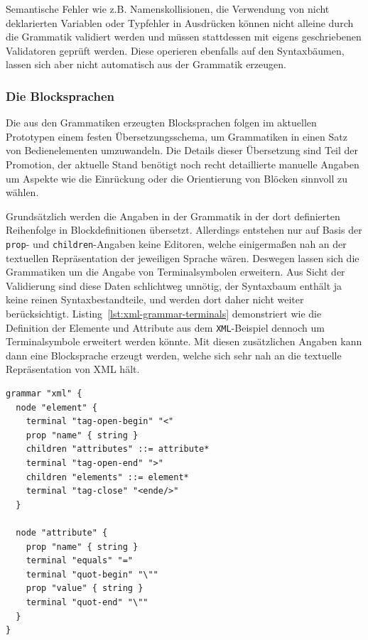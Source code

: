 \documentclass[paper=a4,fontsize=12pt,parskip=half]{scrartcl}
\begin{document}
Semantische Fehler wie z.B. Namenskollisionen, die Verwendung von nicht deklarierten Variablen oder Typfehler in Ausdrücken können nicht alleine durch die Grammatik validiert werden und müssen stattdessen mit eigens geschriebenen Validatoren geprüft werden. Diese operieren ebenfalls auf den Syntaxbäumen, lassen sich aber nicht automatisch aus der Grammatik erzeugen.

\subsubsection{Die Blocksprachen}

Die aus den Grammatiken erzeugten Blocksprachen folgen im aktuellen Prototypen einem festen Übersetzungsschema, um Grammatiken in einen Satz von Bedienelementen umzuwandeln. Die Details dieser Übersetzung sind Teil der Promotion, der aktuelle Stand benötigt noch recht detaillierte manuelle Angaben um Aspekte wie die Einrückung oder die Orientierung von Blöcken sinnvoll zu wählen.

Grundsätzlich werden die Angaben in der Grammatik in der dort definierten Reihenfolge in Blockdefinitionen übersetzt. Allerdings entstehen nur auf Basis der \texttt{prop}- und \texttt{children}-Angaben keine Editoren, welche einigermaßen nah an der textuellen Repräsentation der jeweiligen Sprache wären. Deswegen lassen sich die Grammatiken um die Angabe von Terminalsymbolen erweitern. Aus Sicht der Validierung sind diese Daten schlichtweg unnötig, der Syntaxbaum enthält ja keine reinen Syntaxbestandteile, und werden dort daher nicht weiter berücksichtigt. Listing~\ref{lst:xml-grammar-terminals} demonstriert wie die Definition der Elemente und Attribute aus dem \texttt{XML}-Beispiel dennoch um Terminalsymbole erweitert werden könnte. Mit diesen zusätzlichen Angaben kann dann eine Blocksprache erzeugt werden, welche sich sehr nah an die textuelle Repräsentation von XML hält.

\begin{lstlisting}[float=h, label={lst:xml-grammar-terminals},caption={Terminalsymbole für Attribute und Elemente in \texttt{XML} },captionpos=b,language={Grammar}]
grammar "xml" {
  node "element" {
    terminal "tag-open-begin" "<"
    prop "name" { string }
    children "attributes" ::= attribute*
    terminal "tag-open-end" ">"
    children "elements" ::= element*
    terminal "tag-close" "<ende/>"
  }

  node "attribute" {
    prop "name" { string }
    terminal "equals" "="
    terminal "quot-begin" "\""
    prop "value" { string }
    terminal "quot-end" "\""
  }
}
\end{lstlisting}
\end{document}

